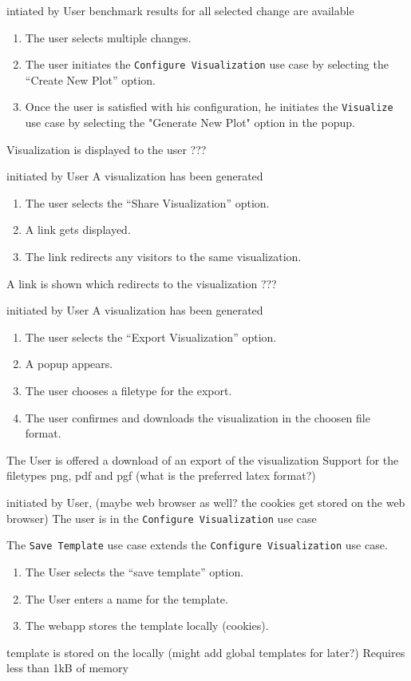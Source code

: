 \bigskip

{intiated by User}
{benchmark results for all selected change are available}
{\begin{enumerate}
    \item The user selects multiple changes.
    \item The user initiates the \texttt{Configure Visualization} use case by selecting the \enquote{Create New Plot} option.
    \item Once the user is satisfied with his \gls{configuration}, he initiates the \texttt{Visualize} use case by selecting the "Generate New Plot" option in the popup.
\end{enumerate}}
{Visualization is displayed to the user}
{???}

\bigskip

{initiated by User}
{A \gls{visualization} has been generated}
{\begin{enumerate}
    \item The user selects the \enquote{Share Visualization} option.
    \item A link gets displayed.
    \item The link redirects any visitors to the same \gls{visualization}.
\end{enumerate}} 
{A link is shown which redirects to the \gls{visualization}}
{???}

\bigskip

{initiated by User}
{A \gls{visualization} has been generated}
{\begin{enumerate}
    \item The user selects the \enquote{Export Visualization} option.
    \item A popup appears.
    \item The user chooses a filetype for the export.
    \item The user confirmes and downloads the \gls{visualization} in the choosen file format.
\end{enumerate}} 
{The User is offered a download of an export of the \gls{visualization}}
{Support for the filetypes png, pdf and pgf (what is the preferred latex format?)}

\bigskip

{initiated by User, (maybe web browser as well? the cookies get stored on the web browser)}
{The user is in the \texttt{Configure Visualization} use case}
{The \texttt{Save Template} use case extends the \texttt{Configure Visualization} use case.
\begin{enumerate}
    \item The User selects the \enquote{save template} option.
    \item The User enters a name for the \gls{template}.
    \item The webapp stores the template locally (cookies).
\end{enumerate}} 
{\Gls{template} is stored on the locally (might add global templates for later?)}
{Requires less than 1kB of memory}

